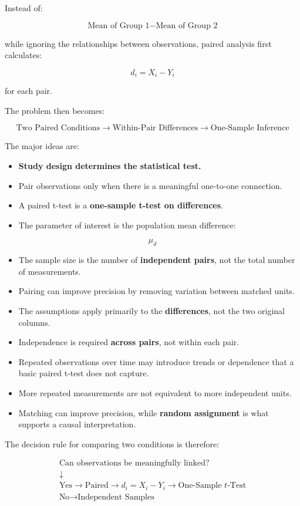\documentclass[
  letterpaper,
  DIV=11,
  numbers=noendperiod]{scrreprt}
\providecommand{\tightlist}{%
  \setlength{\itemsep}{0pt}\setlength{\parskip}{0pt}}
\begin{document}
Instead of:

\[
\text{Mean of Group 1}
-
\text{Mean of Group 2}
\]

while ignoring the relationships between observations, paired analysis
first calculates:

\[
d_i=X_i-Y_i
\]

for each pair.

The problem then becomes:

\[
\boxed{
\text{Two Paired Conditions}
\rightarrow
\text{Within-Pair Differences}
\rightarrow
\text{One-Sample Inference}
}
\]

The major ideas are:

\begin{itemize}
\tightlist
\item
  \textbf{Study design determines the statistical test.}
\item
  Pair observations only when there is a meaningful one-to-one
  connection.
\item
  A paired t-test is a \textbf{one-sample t-test on differences}.
\item
  The parameter of interest is the population mean difference:
\end{itemize}

\[
\mu_d
\]

\begin{itemize}
\tightlist
\item
  The sample size is the number of \textbf{independent pairs}, not the
  total number of measurements.
\item
  Pairing can improve precision by removing variation between matched
  units.
\item
  The assumptions apply primarily to the \textbf{differences}, not the
  two original columns.
\item
  Independence is required \textbf{across pairs}, not within each pair.
\item
  Repeated observations over time may introduce trends or dependence
  that a basic paired t-test does not capture.
\item
  More repeated measurements are not equivalent to more independent
  units.
\item
  Matching can improve precision, while \textbf{random assignment} is
  what supports a causal interpretation.
\end{itemize}

The decision rule for comparing two conditions is therefore:

\[
\boxed{
\begin{array}{c}
\text{Can observations be meaningfully linked?}\\[4pt]
\downarrow\\
\text{Yes}
\rightarrow
\text{Paired}
\rightarrow
d_i=X_i-Y_i
\rightarrow
\text{One-Sample }t\text{-Test}\\[6pt]
\text{No}
\rightarrow
\text{Independent Samples}
\end{array}
}
\]
\end{document}
